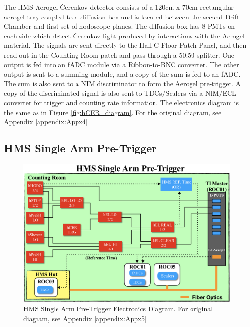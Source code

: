 \documentclass[11pt]{article}
\begin{document}
\indent The HMS Aerogel \v{C}erenkov detector consists of a 120cm x 70cm rectangular aerogel tray coupled to a diffusion box\cite{hms_aero_article} and is located
between the second Drift Chamber and first set of hodoscope planes. The diffusion box has 8 PMTs on each side
which detect \v{C}erenkov light produced by interactions with the Aerogel material. The signals are sent directly to the Hall C Floor Patch Panel, and then
read out in the Counting Room patch and pass through a 50:50 splitter. One output is fed into an fADC module via a Ribbon-to-BNC converter. The other output is
sent to a summing module, and a copy of the sum is fed to an fADC. The sum is also sent to a NIM discriminator to form the Aerogel pre-trigger.
A copy of the discriminated signal is also sent to TDCs/Scalers via a NIM/ECL converter for trigger and counting rate information.
The electronics diagram is the same as in Figure \ref{fig:hCER_diagram}. For the original diagram, see Appendix \ref{appendix:Appx4}

\newpage
\subsection{HMS Single Arm Pre-Trigger}\label{ssec:hms_single_arm_sec}
\begin{figure}[h!]
  \centering
  \includegraphics[scale=0.5]{HMS_SingleArm_diagram.png}
  \caption{HMS Single Arm Pre-Trigger Electronics Diagram. For original diagram, see Appendix \ref{appendix:Appx5}}
  \label{fig:HMS_SingleArm_diagram}
\end{figure}
\end{document}
